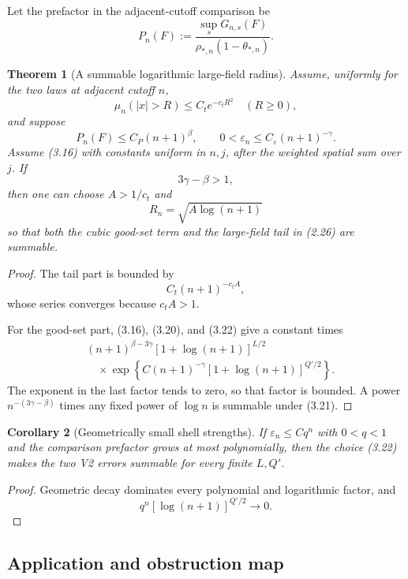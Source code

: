 \documentclass[11pt]{article}
\newtheorem{theorem}{Theorem}[section]
\newtheorem{corollary}[theorem]{Corollary}
\theoremstyle{remark}
\begin{document}
Let the prefactor in the adjacent-cutoff comparison be
\[
 P_n(F):=
 \frac{\sup_sG_{n,s}(F)}
 {\rho_{*,n}(1-\theta_{*,n})}.                      \tag{3.18}
\]

\begin{theorem}[A summable logarithmic large-field radius]
\label{thm:v17v3-summability}
Assume, uniformly for the two laws at adjacent cutoff \(n\),
\[
 \mu_n(|x|>R)\leq C_te^{-c_tR^2}
 \quad(R\geq0),                                     \tag{3.19}
\]
and suppose
\[
 P_n(F)\leq C_P(n+1)^\beta,\qquad
 0<\varepsilon_n\leq C_\varepsilon(n+1)^{-\gamma}. \tag{3.20}
\]
Assume (3.16) with constants uniform in \(n,j\), after the weighted
spatial sum over \(j\).  If
\[
 3\gamma-\beta>1,                                  \tag{3.21}
\]
then one can choose \(A>1/c_t\) and
\[
 R_n=\sqrt{A\log(n+1)}                              \tag{3.22}
\]
so that both the cubic good-set term and the large-field tail in
(2.26) are summable.
\end{theorem}

\begin{proof}
The tail part is bounded by
\[
 C_t(n+1)^{-c_tA},
\]
whose series converges because \(c_tA>1\).

For the good-set part, (3.16), (3.20), and (3.22) give a constant
times
\[
\begin{split}
 &(n+1)^{\beta-3\gamma}
 [1+\log(n+1)]^{L/2}\\
 &\quad\times
 \exp\left\{
 C(n+1)^{-\gamma}
 [1+\log(n+1)]^{Q'/2}
 \right\}.                                         \tag{3.23}
\end{split}
\]
The exponent in the last factor tends to zero, so that factor is
bounded.  A power \(n^{-(3\gamma-\beta)}\) times any fixed power of
\(\log n\) is summable under (3.21).
\end{proof}

\begin{corollary}[Geometrically small shell strengths]
\label{cor:v17v3-geometric}
If \(\varepsilon_n\leq Cq^n\) with \(0<q<1\) and the comparison
prefactor grows at most polynomially, then the choice (3.22) makes
the two V2 errors summable for every finite \(L,Q'\).
\end{corollary}

\begin{proof}
Geometric decay dominates every polynomial and logarithmic factor,
and
\[
 q^n[\log(n+1)]^{Q'/2}\longrightarrow0.
\]
\end{proof}

\subsection{Application and obstruction map}
\end{document}
